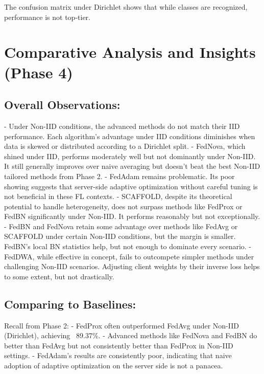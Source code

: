\documentclass[12pt,a4paper]{report}
\begin{document}
The confusion matrix under Dirichlet shows that while classes are recognized, performance is not top-tier.

\section{Comparative Analysis and Insights (Phase 4)}

\subsection*{Overall Observations:}
- Under Non-IID conditions, the advanced methods do not match their IID performance. Each algorithm’s advantage under IID conditions diminishes when data is skewed or distributed according to a Dirichlet split.
- FedNova, which shined under IID, performs moderately well but not dominantly under Non-IID. It still generally improves over naive averaging but doesn’t beat the best Non-IID tailored methods from Phase 2.
- FedAdam remains problematic. Its poor showing suggests that server-side adaptive optimization without careful tuning is not beneficial in these FL contexts.
- SCAFFOLD, despite its theoretical potential to handle heterogeneity, does not surpass methods like FedProx or FedBN significantly under Non-IID. It performs reasonably but not exceptionally.
- FedBN and FedNova retain some advantage over methods like FedAvg or SCAFFOLD under certain Non-IID conditions, but the margin is smaller. FedBN’s local BN statistics help, but not enough to dominate every scenario.
- FedDWA, while effective in concept, fails to outcompete simpler methods under challenging Non-IID scenarios. Adjusting client weights by their inverse loss helps to some extent, but not drastically.

\subsection*{Comparing to Baselines:}
Recall from Phase 2:
- FedProx often outperformed FedAvg under Non-IID (Dirichlet), achieving ~89.37\%.
- Advanced methods like FedNova and FedBN do better than FedAvg but not consistently better than FedProx in Non-IID settings.
- FedAdam’s results are consistently poor, indicating that naive adoption of adaptive optimization on the server side is not a panacea.
\end{document}
